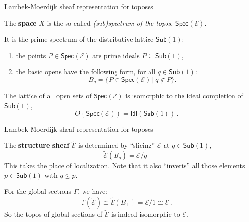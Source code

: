 \documentclass{beamer}
\newcommand{\E}{\ensuremath{\mathcal{E}}}
\newcommand{\myemph}[1]{\textbf{#1}}    %
\begin{document}
\begin{frame}{Lambek-Moerdijk sheaf representation for toposes}

The \myemph{space} $X$ is the so-called \emph{(sub)spectrum of the topos},  $\mathsf{Spec}(\E)$.\\  
\medskip

It is the prime spectrum of the distributive lattice $\mathsf{Sub}(1)$:
 \begin{enumerate}
\item the points $P\in \mathsf{Spec}(\E)$ are prime ideals $P\subseteq \mathsf{Sub}(1)$,
\item the basic opens have the following form, for all $q\in\mathsf{Sub}(1)$:
$$B_q = \{ P\in \mathsf{Spec}(\E)\ |\ q\not\in P \}.$$
\end{enumerate}

The lattice of all open sets of $\mathsf{Spec}(\E)$ is isomorphic to the ideal completion of $\mathsf{Sub}(1)$,
$$O(\mathsf{Spec}(\E)) = \mathsf{Idl}(\mathsf{Sub}(1))\,.$$

%

\end{frame}
\begin{frame}{Lambek-Moerdijk sheaf representation for toposes}


The \myemph{structure sheaf} $\tilde{\E}$ is determined by ``slicing'' $\E$ at $q \in\mathsf{Sub}(1)$,
\[
\tilde{\E}(B_q) = \E/q\,.
\]
This takes the place of localization.  Note that it also ``inverts'' all those elements $p\in \mathsf{Sub}(1)$ with $q\leq p$. 
\bigskip

For the global sections $\Gamma$, we have:
$$\Gamma(\tilde{\E}) \cong \tilde{\E}(B_\top) = \E/1 \cong \E\,.$$
So the topos of global sections of $\tilde{\E}$ is indeed  isomorphic to $\E$.
\end{frame}
\end{document}
